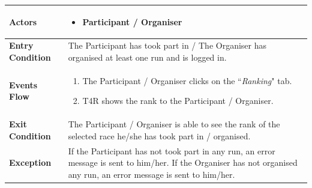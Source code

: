             \begin{table}[H]
            	\centering
                
                \begin{tabular}{|p{3cm}|p{8.2cm}|}
                    \hline
                    \textbf{Actors} & \begin{itemize}
                                            \item Participant / Organiser
                                        \end{itemize} \\
                     \hline
                    \textbf{Entry Condition} & The Participant has took part in / The Organiser has organised at least                              one run and is logged in. \\
                     \hline
                    \textbf{Events Flow} & \begin{enumerate}
                                                \item The Participant / Organiser clicks on the ``\emph{Ranking}" tab.
                                                \item T4R shows the rank to the Participant / Organiser.
                                            \end{enumerate} \\
                     \hline
                    \textbf{Exit Condition} & The Participant / Organiser is able to see the rank of the selected race                             he/she has took part in / organised. \\
                     \hline
                    \textbf{Exception} & If the Participant has not took part in any run, an error                       message is sent to him/her. \newline
                                         If the Organiser has not organised any run, an error message is sent to him/her. \\
                     \hline
                \end{tabular}  
            \end{table}
            
